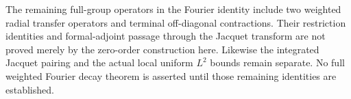 The remaining full-group operators in the Fourier
identity include two weighted radial transfer
operators and terminal off-diagonal contractions.
Their restriction identities and formal-adjoint
passage through the Jacquet transform are not
proved merely by the zero-order construction here.
Likewise the integrated Jacquet pairing and the
actual local uniform $L^2$ bounds remain separate.
No full weighted Fourier decay theorem is asserted
until those remaining identities are established.


